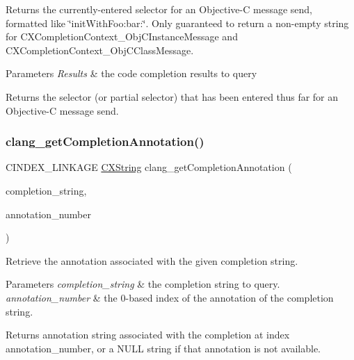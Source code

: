 Returns the currently-\/entered selector for an Objective-\/C message send, formatted like \char`\"{}init\+With\+Foo\+:bar\+:\char`\"{}. Only guaranteed to return a non-\/empty string for C\+X\+Completion\+Context\+\_\+\+Obj\+C\+Instance\+Message and C\+X\+Completion\+Context\+\_\+\+Obj\+C\+Class\+Message. 


\begin{DoxyParams}{Parameters}
{\em Results} & the code completion results to query\\
\hline
\end{DoxyParams}
\begin{DoxyReturn}{Returns}
the selector (or partial selector) that has been entered thus far for an Objective-\/C message send. 
\end{DoxyReturn}
\mbox{\label{group__CINDEX__CODE__COMPLET_ga5a6995822b664926ac3d919d69e736ce}} 
\subsubsection{\texorpdfstring{clang\+\_\+get\+Completion\+Annotation()}{clang\_getCompletionAnnotation()}}
{\footnotesize\ttfamily C\+I\+N\+D\+E\+X\+\_\+\+L\+I\+N\+K\+A\+GE \hyperlink{structCXString}{C\+X\+String} clang\+\_\+get\+Completion\+Annotation (\begin{DoxyParamCaption}\item[{\hyperlink{group__CINDEX__CODE__COMPLET_gafea23a43a60ec3b4f3bedccfbb76883a}{C\+X\+Completion\+String}}]{completion\+\_\+string,  }\item[{unsigned}]{annotation\+\_\+number }\end{DoxyParamCaption})}



Retrieve the annotation associated with the given completion string. 


\begin{DoxyParams}{Parameters}
{\em completion\+\_\+string} & the completion string to query.\\
\hline
{\em annotation\+\_\+number} & the 0-\/based index of the annotation of the completion string.\\
\hline
\end{DoxyParams}
\begin{DoxyReturn}{Returns}
annotation string associated with the completion at index {\ttfamily annotation\+\_\+number}, or a N\+U\+LL string if that annotation is not available. 
\end{DoxyReturn}
\mbox{\label{group__CINDEX__CODE__COMPLET_gacbbded5dd9c27b927ed5080d8b530845}} 

